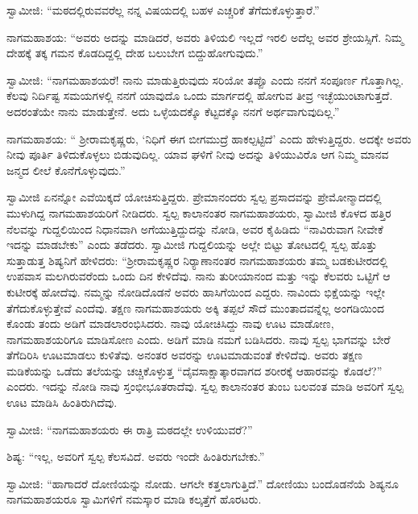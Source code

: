  ಸ್ವಾಮೀಜಿ: “ಮಠದಲ್ಲಿರುವವರೆಲ್ಲ ನನ್ನ ವಿಷಯದಲ್ಲಿ ಬಹಳ ಎಚ್ಚರಿಕೆ ತೆಗೆದುಕೊಳ್ಳುತ್ತಾರೆ.” 

 ನಾಗಮಹಾಶಯ: “ಅವರು ಅದನ್ನು ಮಾಡಿದರೆ, ಅವರು ತಿಳಿಯಲಿ ಇಲ್ಲದೆ ಇರಲಿ ಅದೆಲ್ಲ ಅವರ ಶ್ರೇಯಸ್ಸಿಗೆ. ನಿಮ್ಮ ದೇಹಕ್ಕೆ ತಕ್ಕ ಗಮನ ಕೊಡದಿದ್ದಲ್ಲಿ ದೇಹ ಬಲುಬೇಗ ಬಿದ್ದುಹೋಗುವುದು.” 

 ಸ್ವಾಮೀಜಿ: “ನಾಗಮಹಾಶಯರೆ! ನಾನು ಮಾಡುತ್ತಿರುವುದು ಸರಿಯೋ ತಪ್ಪೊ ಎಂದು ನನಗೆ ಸಂಪೂರ್ಣ ಗೊತ್ತಾಗಿಲ್ಲ. ಕೆಲವು ನಿರ್ದಿಷ್ಟ ಸಮಯಗಳಲ್ಲಿ ನನಗೆ ಯಾವುದೊ ಒಂದು ಮಾರ್ಗದಲ್ಲಿ ಹೋಗುವ ತೀವ್ರ ಇಚ್ಛೆಯುಂಟಾಗುತ್ತದೆ. ಅದರಂತೆಯೇ ನಾನು ಮಾಡುತ್ತೇನೆ. ಅದು ಒಳ್ಳೆಯದಕ್ಕೊ ಕೆಟ್ಟದಕ್ಕೊ ನನಗೆ ಅರ್ಥವಾಗುವುದಿಲ್ಲ.” 

 ನಾಗಮಹಾಶಯ: “ ಶ‍್ರೀರಾಮಕೃಷ್ಣರು, ‘ನಿಧಿಗೆ ಈಗ ಬೀಗಮುದ್ರೆ ಹಾಕಲ್ಪಟ್ಟಿದೆ’ ಎಂದು ಹೇಳುತ್ತಿದ್ದರು. ಅದಕ್ಕೇ ಅವರು ನೀವು ಪೂರ್ತಿ ತಿಳಿದುಕೊಳ್ಳಲು ಬಿಡುವುದಿಲ್ಲ. ಯಾವ ಘಳಿಗೆ ನೀವು ಅದನ್ನು ತಿಳಿಯುವಿರೊ ಆಗ ನಿಮ್ಮ ಮಾನವ ಜನ್ಮದ ಲೀಲೆ ಕೊನೆಗೊಳ್ಳುವುದು.” 

 ಸ್ವಾಮೀಜಿ ಏನನ್ನೋ ಎವೆಯಿಕ್ಕದೆ ಯೋಚಿಸುತ್ತಿದ್ದರು. ಪ್ರೇಮಾನಂದರು ಸ್ವಲ್ಪ ಪ್ರಸಾದವನ್ನು ಪ್ರೇಮೋನ್ಮಾದದಲ್ಲಿ ಮುಳುಗಿದ್ದ ನಾಗಮಹಾಶಯರಿಗೆ ನೀಡಿದರು. ಸ್ವಲ್ಪ ಕಾಲಾನಂತರ ನಾಗಮಹಾಶಯರು, ಸ್ವಾಮೀಜಿ ಕೊಳದ ಹತ್ತಿರ ನೆಲವನ್ನು ಗುದ್ದಲಿಯಿಂದ ನಿಧಾನವಾಗಿ ಅಗೆಯುತ್ತಿದ್ದುದನ್ನು ನೋಡಿ, ಅವರ ಕೈಹಿಡಿದು “ನಾವಿರುವಾಗ ನೀವೇಕೆ ಇದನ್ನು ಮಾಡಬೇಕು” ಎಂದು ತಡೆದರು. ಸ್ವಾಮೀಜಿ ಗುದ್ದಲಿಯನ್ನು ಅಲ್ಲೇ ಬಿಟ್ಟು ತೋಟದಲ್ಲಿ ಸ್ವಲ್ಪ ಹೊತ್ತು ಸುತ್ತಾಡುತ್ತ ಶಿಷ್ಯನಿಗೆ ಹೇಳಿದರು: “ಶ‍್ರೀರಾಮಕೃಷ್ಣರ ನಿರ‍್ಯಾಣಾನಂತರ ನಾಗಮಹಾಶಯರು ತಮ್ಮ ಬಡಕುಟೀರದಲ್ಲಿ ಉಪವಾಸ ಮಲಗಿರುವರೆಂದು ಒಂದು ದಿನ ಕೇಳಿದೆವು. ನಾನು ತುರೀಯಾನಂದ ಮತ್ತು ಇನ್ನು ಕೆಲವರು ಒಟ್ಟಿಗೆ ಆ‌ ಕುಟೀರಕ್ಕೆ ಹೋದೆವು. ನಮ್ಮನ್ನು ನೋಡಿದೊಡನೆ ಅವರು ಹಾಸಿಗೆಯಿಂದ ಎದ್ದರು. ನಾವಿಂದು ಭಿಕ್ಷೆಯನ್ನು ಇಲ್ಲೇ ತೆಗೆದುಕೊಳ್ಳುತ್ತೇವೆ ಎಂದೆವು. ತಕ್ಷಣ ನಾಗಮಹಾಶಯರು ಅಕ್ಕಿ ತಪ್ಪಲೆ ಸೌದೆ ಮುಂತಾದವನ್ನೆಲ್ಲ ಅಂಗಡಿಯಿಂದ ಕೊಂಡು ತಂದು ಅಡಿಗೆ ಮಾಡಲಾರಂಭಿಸಿದರು. ನಾವು ಯೋಚಿಸಿದ್ದು ನಾವು ಊಟ ಮಾಡೋಣ, ನಾಗಮಹಾಶಯರಿಗೂ ಮಾಡಿಸೋಣ ಎಂದು. ಅಡಿಗೆ ಮಾಡಿ ನಮಗೆ ಬಡಿಸಿದರು. ನಾವು ಸ್ವಲ್ಪ ಭಾಗವನ್ನು ಬೇರೆ ತೆಗೆದಿರಿಸಿ ಊಟಮಾಡಲು ಕುಳಿತೆವು. ಅನಂತರ ಅವರನ್ನು ಊಟಮಾಡುವಂತೆ ಕೇಳಿದೆವು. ಅವರು ತಕ್ಷಣ ಮಡಿಕೆಯನ್ನು ಒಡೆದು ತಲೆಯನ್ನು ಚಚ್ಚಿಕೊಳ್ಳುತ್ತ “ದೈವಸಾಕ್ಷಾತ್ಕಾರವಾಗದ ಶರೀರಕ್ಕೆ ಆಹಾರವನ್ನು ಕೊಡಲೆ?” ಎಂದರು. ಇದನ್ನು ನೋಡಿ ನಾವು ಸ್ತಂಭೀಭೂತರಾದೆವು. ಸ್ವಲ್ಪ ಕಾಲಾನಂತರ ತುಂಬ ಬಲವಂತ ಮಾಡಿ ಅವರಿಗೆ ಸ್ವಲ್ಪ ಊಟ ಮಾಡಿಸಿ ಹಿಂತಿರುಗಿದೆವು. 

 ಸ್ವಾಮೀಜಿ: “ನಾಗಮಹಾಶಯರು ಈ ರಾತ್ರಿ ಮಠದಲ್ಲೇ ಉಳಿಯುವರೆ?” 

 ಶಿಷ್ಯ: “ಇಲ್ಲ, ಅವರಿಗೆ ಸ್ವಲ್ಪ ಕೆಲಸವಿದೆ. ಅವರು ಇಂದೇ ಹಿಂತಿರುಗಬೇಕು.” 

 ಸ್ವಾಮೀಜಿ: “ಹಾಗಾದರೆ ದೋಣಿಯನ್ನು ನೋಡು. ಆಗಲೇ ಕತ್ತಲಾಗುತ್ತಿದೆ.” ದೋಣಿಯು ಬಂದೊಡನೆಯೆ ಶಿಷ್ಯನೂ ನಾಗಮಹಾಶಯರೂ ಸ್ವಾಮಿಗಳಿಗೆ ನಮಸ್ಕಾರ ಮಾಡಿ ಕಲ್ಕತ್ತೆಗೆ ಹೊರಟರು. 

